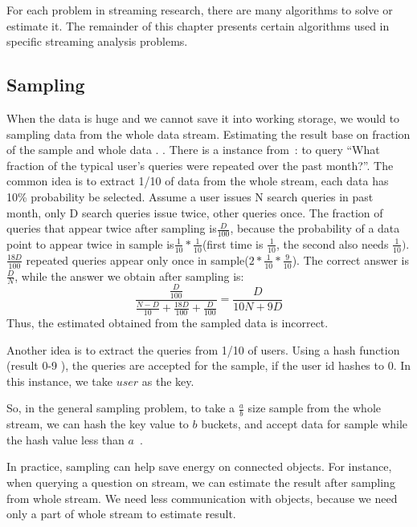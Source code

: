 For each problem in streaming research, there are many algorithms to solve or
estimate it. The remainder of this chapter presents certain algorithms used in
specific streaming analysis problems.

\subsection{Sampling}

When the data is huge and we cannot save it into working storage, we would
 to
sampling data from the whole data stream. Estimating the result base on fraction
of the sample and whole data .
. There is a
instance from~\cite{leskovec2014mining}: to query ``What fraction of the typical
user's queries were repeated over the past month?''. The common idea is to
extract 1/10 of data from the whole stream, each data has 10\% probability be
selected. Assume a user issues N search queries in past month, only D search
queries issue twice, other queries once. The fraction of queries that appear twice after sampling
is$\frac{D}{100}$, because the probability of a data point to appear twice in sample
is$\frac{1}{10}*\frac{1}{10}$(first time  is $\frac{1}{10}$, the second
 also needs $\frac{1}{10})$. $\frac{18D}{100}$ repeated queries appear only
once in sample($2*\frac{1}{10}*\frac{9}{10}$). The correct answer is
$\frac{D}{N}$, while the answer we obtain after sampling is:
\begin{equation*}
    \frac{\frac{D}{100}}{\frac{N-D}{10}+\frac{18D}{100}+\frac{D}{100}} = \frac{D}{10N+9D}
\end{equation*}
Thus, the estimated obtained from the sampled data is incorrect.

Another idea is to extract the queries from 1/10 of users. Using a hash
function (result 0-9 ), the queries are accepted for the
sample, if the user id hashes to 0. In this instance, we take $user$ as the
key. 

So, in the general sampling problem, to take a $\frac{a}{b}$ size sample
from the whole stream, we can hash the key value to $b$ buckets, and accept
data for sample while the hash value less than
$a$~\cite{leskovec2014mining}.

In practice, sampling can help save energy on connected objects. For
instance, when querying a question on stream, we can estimate the result
after sampling from whole stream. We need less communication with objects,
because we need only a part of whole stream to estimate result.  

